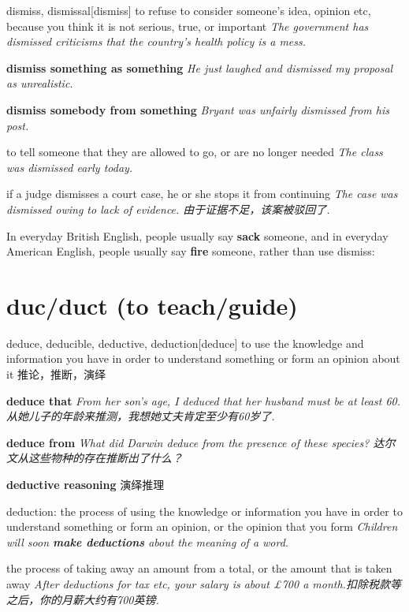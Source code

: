 \begin{DefWord}{dismiss, dismissal}[dismiss]
    to refuse to consider someone's idea, opinion etc, because you think it is not serious, true, or important
    \textit{The government has dismissed criticisms that the country's health policy is a mess.}

    \textbf{dismiss something as something}
    \textit{He just laughed and dismissed my proposal as unrealistic.}

    \textbf{dismiss somebody from something}
    \textit{ Bryant was unfairly dismissed from his post.}

    to tell someone that they are allowed to go, or are no longer needed
    \textit{The class was dismissed early today.}

    if a judge dismisses a court case, he or she stops it from continuing
    \textit{The case was dismissed owing to lack of evidence. 由于证据不足，该案被驳回了. }
\end{DefWord}

\begin{remark}
    In everyday British English, people usually say \textbf{sack} someone, and in everyday American English, people usually say \textbf{fire} someone, rather than use dismiss:
\end{remark}

\section{duc/duct (to teach/guide)}

\begin{DefWord}{deduce, deducible, deductive, deduction}[deduce]
    to use the knowledge and information you have in order to understand something or form an opinion about it 推论，推断，演绎

    \textbf{deduce that}
    \textit{From her son's age, I deduced that her husband must be at least 60. 从她儿子的年龄来推测，我想她丈夫肯定至少有60岁了. }

    \textbf{deduce from}
    \textit{What did Darwin deduce from the presence of these species? 达尔文从这些物种的存在推断出了什么？}

    \textbf{deductive reasoning} 演绎推理

    deduction: the process of using the knowledge or information you have in order to understand something or form an opinion, or the opinion that you form
    \textit{Children will soon \textbf{make deductions} about the meaning of a word.}

    the process of taking away an amount from a total, or the amount that is taken away
    \textit{After deductions for tax etc, your salary is about £700 a month.扣除税款等之后，你的月薪大约有700英镑. }
\end{DefWord}

